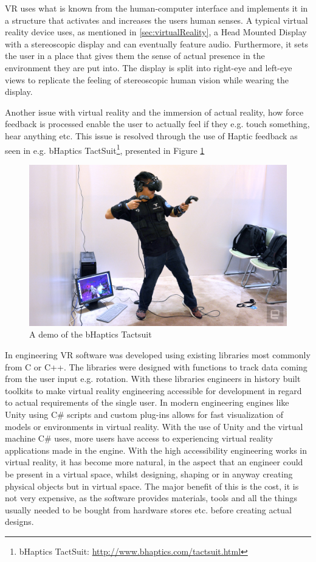 	VR uses what is known from the human-computer interface and implements it in a structure that activates and increases the users human senses. A typical virtual reality device uses, as mentioned in \autoref{sec:virtualReality}, a Head Mounted Display with a stereoscopic display and can eventually feature audio. Furthermore, it sets the user in a place that gives them the sense of actual presence in the environment they are put into. The display is split into right-eye and left-eye views to replicate the feeling of stereoscopic human vision while wearing the display. 
	
	Another issue with virtual reality and the immersion of actual reality, how force feedback is processed enable the user to actually feel if they e.g. touch something, hear anything etc. This issue is resolved through the use of Haptic feedback as seen in e.g. bHaptics TactSuit\footnote{bHaptics TactSuit: \url{http://www.bhaptics.com/tactsuit.html}}, presented in Figure \ref{fig:haptics} \\
	\begin{figure}[H]
	\centering
	\includegraphics[width=1.0\linewidth]{figure/Analysis/haptics}
	\caption{A demo of the bHaptics Tactsuit}
	\label{fig:haptics}
	\end{figure}
	In engineering VR software was developed using existing libraries most commonly from C or C++. The libraries were designed with functions to track data coming from the user input e.g. rotation. With these libraries engineers in history built toolkits to make virtual reality engineering accessible for development in regard to actual requirements of the single user. \cite{engineeringVR}
	In modern engineering engines like Unity using C\# scripts and custom plug-ins allows for fast visualization of models or environments in virtual reality. With the use of Unity and the virtual machine C\# uses, more users have access to experiencing virtual reality applications made in the engine. With the high accessibility engineering works in virtual reality, it has become more natural, in the aspect that an engineer could be present in a virtual space, whilst designing, shaping or in anyway creating physical objects but in virtual space. The major benefit of this is the cost, it is not very expensive, as the software provides materials, tools and all the things usually needed to be bought from hardware stores etc. before creating actual designs. \\ 
	
